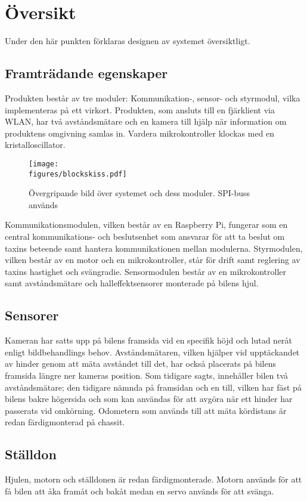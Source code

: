\documentclass[tekniskrapport/tech.tex]{subfiles}
\begin{document}
\section{Översikt}
Under den här punkten förklaras designen av systemet översiktligt.

\subsection{Framträdande egenskaper}
Produkten består av tre moduler: Kommunikation-, sensor- och styrmodul, vilka implementeras på ett virkort. Produkten, som ansluts till en fjärklient via WLAN, har två avståndsmätare och en kamera till hjälp när information om produktens omgivning samlas in. Vardera mikrokontroller klockas med en kristalloscillator.

\begin{figure}[h]
    \centering
    \texttt{[image: \\figures/blockskiss.pdf]}
    \caption{Övergripande bild över systemet och dess moduler. SPI-buss används}
    \label{fig:overview}
\end{figure}

\noindent
Kommunikationsmodulen, vilken består av en Raspberry Pi, fungerar som en central
kommun\-ikations- och beslutsenhet som ansvarar för att ta beslut om taxins
beteende samt hantera kommunikationen mellan modulerna. Styrmodulen, vilken består av
en motor och en mikrokontroller, står för drift samt reglering av taxins
hastighet och svängradie. Sensormodulen består av en mikrokontroller samt
avståndsmätare och halleffektsensorer monterade på bilens hjul.

\subsection{Sensorer}
Kameran har satts upp på bilens framsida vid en specifik höjd och lutad neråt enligt bildbehandlings behov. Avståndsmätaren, vilken hjälper vid upptäckandet av hinder genom att mäta avståndet till det, har också placerats på bilens framsida längre ner kameras position.
Som tidigare sagts, innehåller bilen två avståndsmätare; den tidigare nämnda på framsidan och en till, vilken har fäst på bilens bakre högersida och som kan användas för att avgöra när ett hinder har passerats vid omkörning. Odometern som används till att mäta kördistans är redan färdigmonterad på chassit.

\subsection{Ställdon}
Hjulen, motorn och ställdonen är redan färdigmonterade. Motorn används
för att få bilen att åka framåt och bakåt medan en servo används för att svänga.
\end{document}
